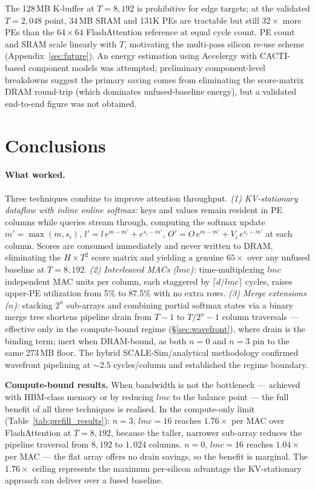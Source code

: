 \documentclass[11pt]{article}
\begin{document}
The 128\,MB K-buffer at $T{=}8{,}192$ is prohibitive for edge targets; at the
validated $T{=}2{,}048$ point, 34\,MB SRAM and 131K PEs are tractable but still
$32\times$ more PEs than the $64{\times}64$ FlashAttention reference at equal
cycle count.
PE count and SRAM scale linearly with $T$, motivating the multi-pass silicon
re-use scheme (Appendix~\ref{sec:future}).
An energy estimation using Accelergy with CACTI-based component models was
attempted; preliminary component-level breakdowns suggest the primary saving
comes from eliminating the score-matrix DRAM round-trip (which dominates
unfused-baseline energy), but a validated end-to-end figure was not obtained.

\section{Conclusions}

\paragraph{What worked.}
Three techniques combine to improve attention throughput.
\emph{(1) KV-stationary dataflow with inline online softmax:} keys and values
remain resident in PE columns while queries stream through, computing the
softmax update $m'{=}\max(m,s_i)$, $l'{=}l\,e^{m-m'}{+}e^{s_i-m'}$,
$O'{=}O\,e^{m-m'}{+}V_i\,e^{s_i-m'}$ at each column.
Scores are consumed immediately and never written to DRAM, eliminating the
$H{\times}T^2$ score matrix and yielding a genuine $65\times$ over any unfused
baseline at $T{=}8{,}192$.
\emph{(2) Interleaved MACs ($lmc$):} time-multiplexing $lmc$ independent MAC
units per column, each staggered by $\lceil d/lmc\rceil$ cycles, raises upper-PE
utilization from 5\% to 87.5\% with no extra rows.
\emph{(3) Merge extensions ($n$):} stacking $2^n$ sub-arrays and combining
partial softmax states via a binary merge tree shortens pipeline drain from
$T{-}1$ to $T/2^n{-}1$ column traversals --- effective only in the
compute-bound regime (\S\ref{sec:wavefront}), where drain is the binding term;
inert when DRAM-bound, as both $n{=}0$ and $n{=}3$ pin to the same 273\,MB floor.
The hybrid SCALE-Sim/analytical methodology confirmed wavefront pipelining
at ${\sim}2.5$ cycles/column and established the regime boundary.

\textbf{Compute-bound results.}
When bandwidth is not the bottleneck --- achieved with HBM-class memory or by
reducing $lmc$ to the balance point --- the full benefit of all three techniques
is realised.
In the compute-only limit (Table~\ref{tab:prefill_results}):
$n{=}3$, $lmc{=}16$ reaches $\mathbf{1.76\times}$ per MAC over FlashAttention at
$T{=}8{,}192$, because the taller, narrower sub-array reduces the pipeline
traversal from $8{,}192$ to $1{,}024$ columns.
$n{=}0$, $lmc{=}16$ reaches $1.04\times$ per MAC --- the flat array offers no
drain savings, so the benefit is marginal.
The $1.76\times$ ceiling represents the maximum per-silicon advantage the
KV-stationary approach can deliver over a fused baseline.
\end{document}
